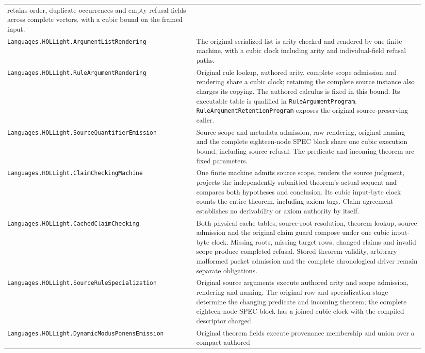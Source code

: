 \documentclass[11pt]{article}
\newcommand{\code}[1]{\nolinkurl{#1}}
\begin{document}
{\begin{longtable}{>{\raggedright\arraybackslash}p{.39\linewidth}>{\raggedright\arraybackslash}p{.55\linewidth}}
  retains order, duplicate occurrences and empty refusal fields across
  complete vectors, with a cubic bound on the framed input.\\
\code{Languages.HOLLight.ArgumentListRendering} & The original serialized
  list is arity-checked and rendered by one finite machine, with a cubic
  clock including arity and individual-field refusal paths.\\
\code{Languages.HOLLight.RuleArgumentRendering} & Original rule lookup,
  authored arity, complete scope admission and rendering share a cubic
  clock; retaining the complete source instance also charges its copying.
  The authored calculus is fixed in this bound. Its executable table is
  qualified in \code{RuleArgumentProgram}; \code{RuleArgumentRetentionProgram}
  exposes the original source-preserving caller.\\
\code{Languages.HOLLight.SourceQuantifierEmission} & Source scope and
  metadata admission, raw rendering, original naming and the complete
  eighteen-node SPEC block share one cubic execution bound, including
  source refusal. The predicate and incoming theorem are fixed parameters.\\
\code{Languages.HOLLight.ClaimCheckingMachine} & One finite machine admits
  source scope, renders the source judgment, projects the independently
  submitted theorem's actual sequent and compares both hypotheses and
  conclusion. Its cubic input-byte clock counts the entire theorem,
  including axiom tags. Claim agreement establishes no derivability or
  axiom authority by itself.\\
\code{Languages.HOLLight.CachedClaimChecking} & Both physical cache tables,
  source-root resolution, theorem lookup, source admission and the original
  claim guard compose under one cubic input-byte clock. Missing roots,
  missing target rows, changed claims and invalid scope produce completed
  refusal. Stored theorem validity, arbitrary malformed packet admission and
  the complete chronological driver remain separate obligations.\\
\code{Languages.HOLLight.SourceRuleSpecialization} & Original source
  arguments execute authored arity and scope admission, rendering and naming.
  The original row and specialization stage determine the changing predicate
  and incoming theorem; the complete eighteen-node SPEC block has a joined
  cubic clock with the compiled descriptor charged.\\
\code{Languages.HOLLight.DynamicModusPonensEmission} & Original theorem
  fields execute provenance membership and union over a compact authored

\end{longtable}}
\end{document}
